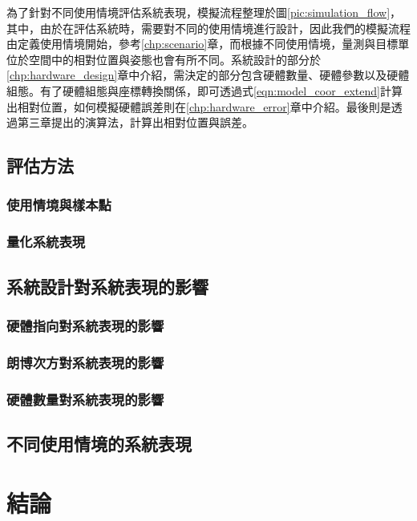 為了針對不同使用情境評估系統表現，模擬流程整理於圖\ref{pic:simulation_flow}，其中，由於在評估系統時，需要對不同的使用情境進行設計，因此我們的模擬流程由定義使用情境開始，參考\ref{chp:scenario}章，而根據不同使用情境，量測與目標單位於空間中的相對位置與姿態也會有所不同。系統設計的部分於\ref{chp:hardware_design}章中介紹，需決定的部分包含硬體數量、硬體參數以及硬體組態。有了硬體組態與座標轉換關係，即可透過式\ref{eqn:model_coor_extend}計算出相對位置，如何模擬硬體誤差則在\ref{chp:hardware_error}章中介紹。最後則是透過第三章提出的演算法，計算出相對位置與誤差。
\subsection{評估方法}
\subsubsection{使用情境與樣本點}
\subsubsection{量化系統表現}


\subsection{系統設計對系統表現的影響}
\subsubsection{硬體指向對系統表現的影響}
\subsubsection{朗博次方對系統表現的影響}
\subsubsection{硬體數量對系統表現的影響}

\subsection{不同使用情境的系統表現}


\section{結論}
\label{chp:4_conclusion}





